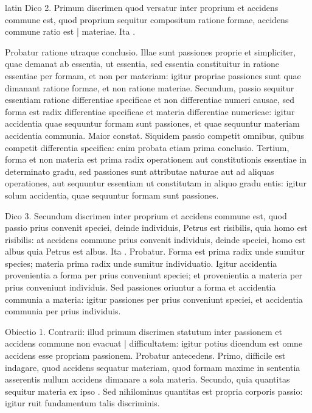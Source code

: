 \begin{otherlanguage*}{latin}
\pstart
  Dico 2. Primum discrimen quod versatur inter proprium et accidens commune est, quod proprium sequitur compositum ratione formae, accidens commune ratio est \textnormal{|} materiae. Ita . 
\pend

\pstart
  Probatur ratione utraque conclusio. Illae sunt passiones proprie et simpliciter, quae demanat ab essentia, ut essentia, sed essentia constituitur in ratione essentiae per formam, et non per materiam: igitur propriae passiones sunt quae dimanant ratione formae, et non ratione materiae. Secundum, passio sequitur essentiam ratione differentiae specificae et non differentiae numeri causae, sed forma est radix differentiae specificae et materia differentiae numericae: igitur accidentia quae sequuntur formam sunt passiones, et quae sequuntur materiam accidentia communia. Maior constat. Siquidem passio competit omnibus, quibus competit differentia specifica: enim probata etiam prima conclusio. Tertium, forma et non materia est prima radix operationem aut constitutionis essentiae in determinato gradu, sed passiones sunt attributae naturae aut ad aliquas operationes, aut sequuntur essentiam ut constitutam in aliquo gradu entis: igitur solum accidentia, quae sequuntur formam sunt passiones. 
\pend

\pstart
  Dico 3. Secundum discrimen inter proprium et accidens commune est, quod passio prius convenit speciei, deinde individuis, Petrus est risibilis, quia homo est risibilis: at accidens commune prius convenit individuis, deinde speciei, homo est albus quia Petrus est albus. Ita . Probatur. Forma est prima radix unde sumitur species; materia prima radix unde sumitur individuatio. Igitur accidentia provenientia a forma per prius conveniunt speciei; et provenientia a materia per prius conveniunt individuis. Sed passiones oriuntur a forma et accidentia communia a materia: igitur passiones per prius conveniunt speciei, et accidentia communia per prius individuis. 
\pend

\pstart
  Obiectio 1. Contrarii: illud primum discrimen statutum inter passionem et accidens commune non evacuat \textnormal{|}   difficultatem: igitur potius dicendum est omne accidens esse propriam passionem. Probatur antecedens. Primo, difficile est indagare, quod accidens sequatur materiam, quod formam maxime in sententia  asserentis nullum accidens dimanare a sola materia. Secundo, quia quantitas sequitur materia ex ipso . Sed nihilominus quantitas est propria corporis passio: igitur ruit fundamentum talis discriminis. 
\pend


\end{otherlanguage*}
